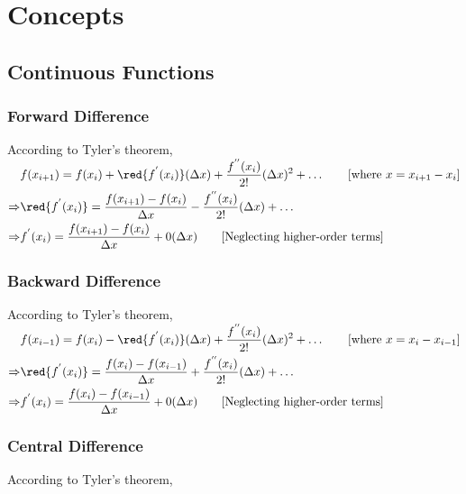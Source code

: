 \chapter{Concepts}

\section*{Continuous Functions}

\subsection*{Forward Difference}
According to Tyler's theorem,\\[0.25em]

\vspace{-1.5\baselineskip}
$\begin{aligned}
   & f(x_{i+1}) = f(x_i) + \red{f^{'}(x_i)}(\Delta x) + \frac{f^{''}(x_i)}{2!}(\Delta x)^2+\ldots \quad \quad [\text{where } x = x_{i+1} - x_i] \\
  \Rightarrow & \red{f^{'}(x_i)} = \frac{f(x_{i+1}) - f(x_i)}{\Delta x} - \frac{f^{''}(x_i)}{2!}(\Delta x) +\ldots \\
  \Rightarrow & f^{'}(x_i) = \frac{f(x_{i+1}) - f(x_i)}{\Delta x} + {0}(\Delta x) \quad \quad [\text{Neglecting higher-order terms}]
\end{aligned}$

\subsection*{Backward Difference}
According to Tyler's theorem,\\[0.25em]

\vspace{-1.5\baselineskip}
$\begin{aligned}
   & f(x_{i-1}) = f(x_i) - \red{f^{'}(x_i)}(\Delta x) + \frac{f^{''}(x_i)}{2!}(\Delta x)^2+\ldots \quad \quad [\text{where } x = x_i - x_{i-1}] \\
   \Rightarrow & \red{f^{'}(x_i)} = \frac{f(x_i) - f(x_{i-1})}{\Delta x} + \frac{f^{''}(x_i)}{2!}(\Delta x) +\ldots \\
   \Rightarrow & f^{'}(x_i) = \frac{f(x_i) - f(x_{i-1})}{\Delta x} + {0}(\Delta x) \quad \quad [\text{Neglecting higher-order terms}]
\end{aligned}$

\subsection*{Central Difference}
According to Tyler's theorem,\\[0.25em]

